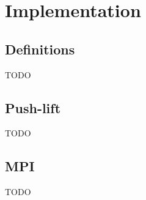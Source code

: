 \chapter{Implementation}

\section{Definitions}

TODO

\section{Push-lift}

TODO

\section{MPI}

TODO
